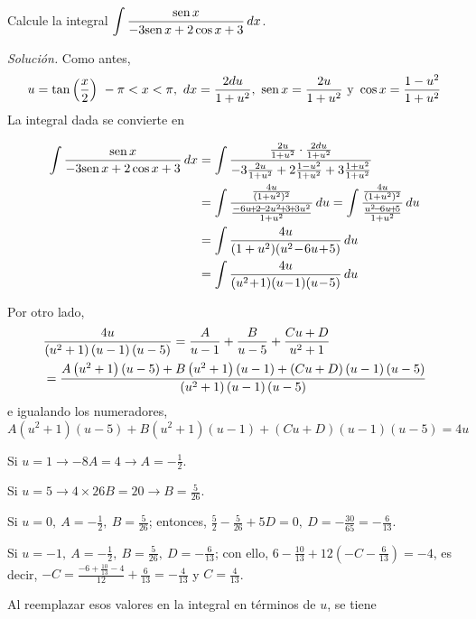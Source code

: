 \begin{ejemplo}
\textnormal{Calcule la integral} $\displaystyle\int \frac{\text{\rm sen}\, x}{-3\text{\rm sen}\, x+2\cos x+3}\, dx $.
\end{ejemplo}
\textit{Solución.} Como antes,
{\small
\[
u=\tan \left( \frac{x}{2}\right)\ -\pi<x<\pi,\ dx=\frac{2du}{1+u^{2}},\ \text{\rm sen}\, x=\frac{2u}{1+u^{2}}\text{ y }\cos x=\frac{1-u^{2}}{1+u^{2}}
\]
}
La integral dada se convierte en

\begin{align*}
	\int \frac{\sen x}{-3\sen x + 2\cos x + 3} \, dx
	&= \int \frac{\frac{2u}{1+u^{2}} \cdot \frac{2du}{1+u^{2}}}{-3\frac{2u}{1+u^{2}} + 2\frac{1-u^{2}}{1+u^{2}} + 3\frac{1+u^{2}}{1+u^{2}}} \\
	&= \int \frac{\frac{4u}{(1+u^{2})^{2}}}{\frac{-6u\!+\!2\!-\!2u^{2}\!+\!3\!+\!3u^{2}}{1+u^{2}}} \, du
	= \int \frac{\frac{4u}{(1+u^{2})^{2}}}{\frac{u^{2}\!-\!6u\!+\!5}{1+u^{2}}} \, du \\
	&= \int \frac{4u}{(1+u^{2})(u^{2}\!-\!6u\!+\!5)} \, du \\
	&= \int \frac{4u}{(u^{2}\!+\!1)(u\!-\!1)(u\!-\!5)} \, du
\end{align*}

Por otro lado,
{\small
\begin{align*}
&\frac{4u}{\left( u^{2}+1\right) \left( u-1\right) \left( u-5\right) }=\frac{%
A}{u-1}+\frac{B}{u-5}+\frac{Cu+D}{u^{2}+1}\\
&=\frac{A\left( u^{2}+1\right) \left( u-5\right) +B\left( u^{2}+1\right)
\left( u-1\right) +\left( Cu+D\right) \left( u-1\right) \left( u-5\right) }{\left( u^{2}+1\right) \left( u-1\right) \left( u-5\right) }
\end{align*}
}
e igualando los numeradores,
{\small
\[
A\left( u^{2}+1\right) \left( u-5\right) +B\left( u^{2}+1\right) \left(
u-1\right) +\left( Cu+D\right) \left( u-1\right) \left( u-5\right) =4u
\]
}

Si $u=1\rightarrow -8A=4\rightarrow A=-\frac{1}{2}$.

Si $u=5\rightarrow 4\times 26B=20\rightarrow B=\frac{5}{26}$.

Si $u=0,\ A=-\frac{1}{2},\ B=\frac{5}{26}$; entonces, $\frac{5}{2}-\frac{5}{26}+5D=0,\ D=-\frac{30}{65}=-\frac{6}{13}$.

Si $u=-1,\ A=-\frac{1}{2},\ B=\frac{5}{26},\ D=-\frac{6}{13}$; con ello, $6-\frac{10}{13}+12\left( -C-\frac{6}{13}\right) =-4$, es decir, $-C=\frac{-6+\frac{10}{13}-4}{12}+\frac{6}{13}=-\frac{4}{13}$ y $C=\frac{4%
}{13}$.

Al reemplazar esos valores en la integral en términos de $u$, se tiene

